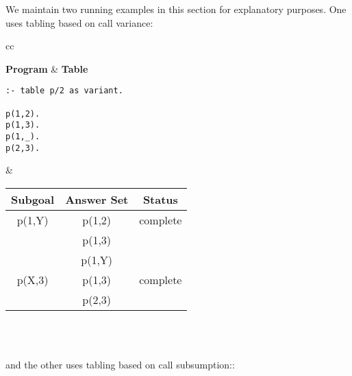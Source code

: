 We maintain two running examples in this section for explanatory
purposes.  One uses tabling based on call variance:
%
\begin{center}
\begin{tabular}{cc}\hline \hline
{} \\ \hline \hline
\rule[-2ex]{0ex}{5ex} \textbf{Program} & \textbf{Table} \\
\begin{minipage}{14.5em}
\begin{verbatim}
:- table p/2 as variant.

p(1,2).
p(1,3).
p(1,_).
p(2,3).
\end{verbatim}
\end{minipage}
&
\begin{tabular}{|c|c|c|} \hline
  Subgoal & Answer Set & Status\\ \hline \hline
  p(1,Y) & p(1,2) & complete \\ 
         & p(1,3) & \\
         & p(1,Y) & \\ \hline
  p(X,3) & p(1,3) & complete \\ 
         & p(2,3) & \\ \hline
\end{tabular} \\
\vspace*{-2ex} \\ \hline \hline
\end{tabular}
\end{center}

\noindent
and the other uses tabling based on call subsumption::

